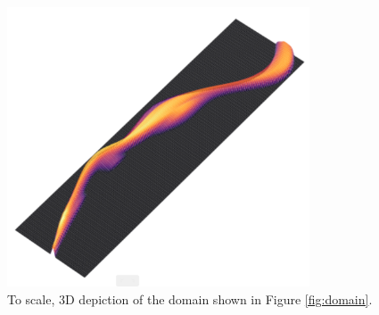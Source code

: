 \begin{figure}[!ht]
\centering
\includegraphics[width=0.8\textwidth]{chapters/4/3d_domain.png}
\caption[3D domain]{To scale, 3D depiction of the domain shown in Figure \ref{fig:domain}. }
\label{fig:3d_domain}
\end{figure}